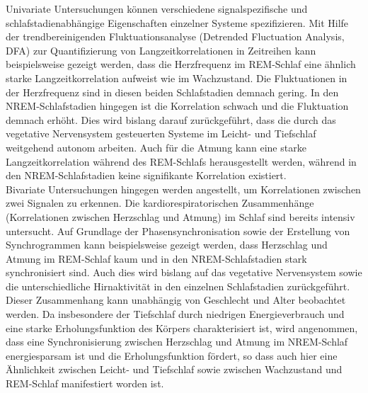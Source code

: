 Univariate Untersuchungen können verschiedene signalspezifische und schlafstadienabhängige Eigenschaften einzelner Systeme spezifizieren. Mit Hilfe der trendbereinigenden Fluktuationsanalyse (Detrended Fluctuation Analysis, DFA) zur Quantifizierung von Langzeitkorrelationen in Zeitreihen kann beispielsweise gezeigt werden, dass die Herzfrequenz im \acs{REM}-Schlaf eine ähnlich starke Langzeitkorrelation aufweist wie im Wachzustand. Die Fluktuationen in der Herzfrequenz sind in diesen beiden Schlafstadien demnach gering. In den \acs{NREM}-Schlafstadien hingegen ist die Korrelation schwach und die Fluktuation demnach erhöht. Dies wird bislang darauf zurückgeführt, dass die durch das vegetative Nervensystem gesteuerten Systeme im Leicht- und Tiefschlaf weitgehend autonom arbeiten. Auch für die Atmung kann eine starke Langzeitkorrelation während des \acs{REM}-Schlafs herausgestellt werden, während in den \acs{NREM}-Schlafstadien keine signifikante Korrelation existiert. \parencite{penzel_cardiovascular_2007}\\

Bivariate Untersuchungen hingegen werden angestellt, um Korrelationen zwischen zwei Signalen zu erkennen. Die kardiorespiratorischen Zusammenhänge (Korrelationen zwischen Herzschlag und Atmung) im Schlaf sind bereits intensiv untersucht. Auf Grundlage der Phasensynchronisation sowie der Erstellung von Synchrogrammen kann beispielsweise gezeigt werden, dass Herzschlag und Atmung im \acs{REM}-Schlaf kaum und in den \acs{NREM}-Schlafstadien stark synchronisiert sind. Auch dies wird bislang auf das vegetative Nervensystem sowie die unterschiedliche Hirnaktivität in den einzelnen Schlafstadien zurückgeführt. Dieser Zusammenhang kann unabhängig von Geschlecht und Alter beobachtet werden. Da insbesondere der Tiefschlaf durch niedrigen Energieverbrauch und eine starke Erholungsfunktion des Körpers charakterisiert ist, wird angenommen, dass eine Synchronisierung zwischen Herzschlag und Atmung im \acs{NREM}-Schlaf energiesparsam ist und die Erholungsfunktion fördert, so dass auch hier eine Ähnlichkeit zwischen Leicht- und Tiefschlaf sowie zwischen Wachzustand und \acs{REM}-Schlaf manifestiert worden ist. \parencite{penzel_cardiovascular_2007, hamann_automated_2009, bartsch_experimental_2007}\\

